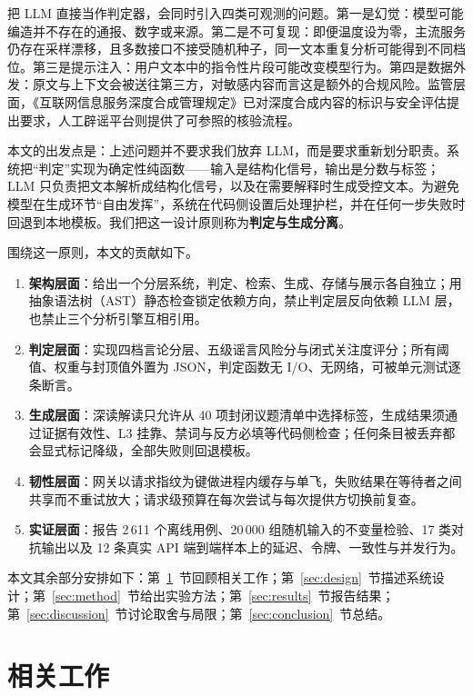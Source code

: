 \documentclass[12pt,a4paper,fontset=windows]{ctexart}
\begin{document}
把 LLM 直接当作判定器，会同时引入四类可观测的问题。第一是幻觉：模型可能编造并不存在的通报、数字或来源\cite{ji2023hallucination}。第二是不可复现：即便温度设为零，主流服务仍存在采样漂移，且多数接口不接受随机种子，同一文本重复分析可能得到不同档位。第三是提示注入：用户文本中的指令性片段可能改变模型行为\cite{perez2022ignore,greshake2023not}。第四是数据外发：原文与上下文会被送往第三方，对敏感内容而言这是额外的合规风险。监管层面，《互联网信息服务深度合成管理规定》已对深度合成内容的标识与安全评估提出要求\cite{cac2023deepfake}，人工辟谣平台则提供了可参照的核验流程\cite{piyao}。

本文的出发点是：上述问题并不要求我们放弃 LLM，而是要求重新划分职责。系统把“判定”实现为确定性纯函数——输入是结构化信号，输出是分数与标签；LLM 只负责把文本解析成结构化信号，以及在需要解释时生成受控文本。为避免模型在生成环节“自由发挥”，系统在代码侧设置后处理护栏，并在任何一步失败时回退到本地模板。我们把这一设计原则称为\textbf{判定与生成分离}。

围绕这一原则，本文的贡献如下。

\begin{enumerate}[label=(\arabic*)]
  \item \textbf{架构层面}：给出一个分层系统，判定、检索、生成、存储与展示各自独立；用抽象语法树（AST）静态检查锁定依赖方向，禁止判定层反向依赖 LLM 层，也禁止三个分析引擎互相引用。
  \item \textbf{判定层面}：实现四档言论分层、五级谣言风险分与闭式关注度评分；所有阈值、权重与封顶值外置为 JSON，判定函数无 I/O、无网络，可被单元测试逐条断言。
  \item \textbf{生成层面}：深读解读只允许从 40 项封闭议题清单中选择标签，生成结果须通过证据有效性、L3 挂靠、禁词与反方必填等代码侧检查；任何条目被丢弃都会显式标记降级，全部失败则回退模板。
  \item \textbf{韧性层面}：网关以请求指纹为键做进程内缓存与单飞，失败结果在等待者之间共享而不重试放大；请求级预算在每次尝试与每次提供方切换前复查。
  \item \textbf{实证层面}：报告 2\,611 个离线用例、20\,000 组随机输入的不变量检验、17 类对抗输出以及 12 条真实 API 端到端样本上的延迟、令牌、一致性与并发行为。
\end{enumerate}

本文其余部分安排如下：第~\ref{sec:related}~节回顾相关工作；第~\ref{sec:design}~节描述系统设计；第~\ref{sec:method}~节给出实验方法；第~\ref{sec:results}~节报告结果；第~\ref{sec:discussion}~节讨论取舍与局限；第~\ref{sec:conclusion}~节总结。

\section{相关工作}\label{sec:related}
\end{document}
